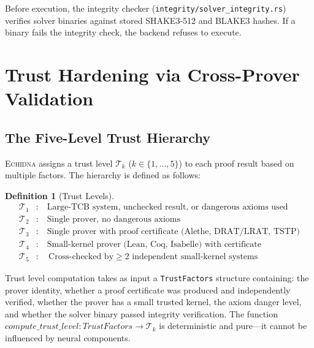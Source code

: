 \documentclass[11pt,a4paper]{article}
\newtheorem{definition}[theorem]{Definition}
\newcommand{\echidna}{\textsc{Echidna}}
\newcommand{\trustlevel}[1]{\ensuremath{\mathcal{T}_{#1}}}
\begin{document}
Before execution, the integrity checker (\texttt{integrity/solver\_integrity.rs})
verifies solver binaries against stored SHAKE3-512 and BLAKE3 hashes. If a
binary fails the integrity check, the backend refuses to execute.


\section{Trust Hardening via Cross-Prover Validation}
\label{sec:trust-hardening}

\subsection{The Five-Level Trust Hierarchy}

\echidna{} assigns a trust level $\trustlevel{k}$ ($k \in \{1,\ldots,5\}$) to
each proof result based on multiple factors. The hierarchy is defined as
follows:

\begin{definition}[Trust Levels]
\label{def:trust}
\begin{align*}
\trustlevel{1} &:\quad \text{Large-TCB system, unchecked result, or dangerous axioms used} \\
\trustlevel{2} &:\quad \text{Single prover, no dangerous axioms} \\
\trustlevel{3} &:\quad \text{Single prover with proof certificate (Alethe, DRAT/LRAT, TSTP)} \\
\trustlevel{4} &:\quad \text{Small-kernel prover (Lean, Coq, Isabelle) with certificate} \\
\trustlevel{5} &:\quad \text{Cross-checked by} \geq 2 \text{ independent small-kernel systems}
\end{align*}
\end{definition}

Trust level computation takes as input a \texttt{TrustFactors} structure
containing: the prover identity, whether a proof certificate was produced and
independently verified, whether the prover has a small trusted kernel, the
axiom danger level, and whether the solver binary passed integrity
verification. The function $\mathit{compute\_trust\_level} :
\mathit{TrustFactors} \to \trustlevel{k}$ is deterministic and pure---it
cannot be influenced by neural components.
\end{document}
